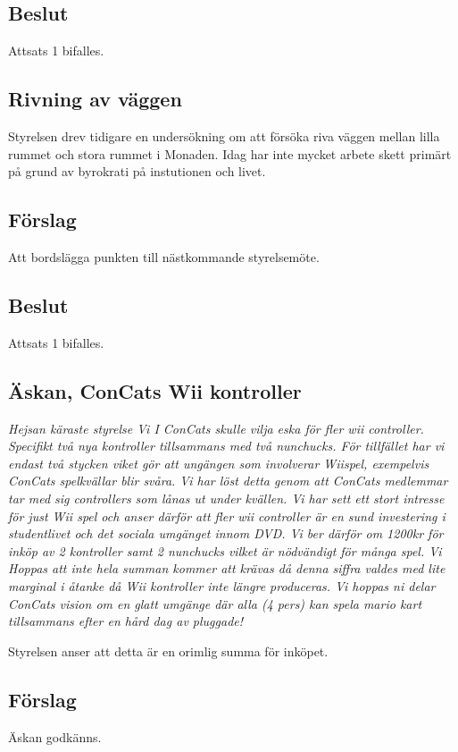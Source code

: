 \documentclass[protokoll]{dvd}
\begin{document}
\subsection{Beslut}
Attsats 1 bifalles.

\subsection*{Rivning av väggen}
Styrelsen drev tidigare en undersökning om att försöka riva väggen mellan lilla rummet och stora rummet i Monaden.
Idag har inte mycket arbete skett primärt på grund av byrokrati på instutionen och livet.

\subsection{Förslag}
\begin{attsatser}
    \item Att bordslägga punkten till nästkommande styrelsemöte.
\end{attsatser}
\subsection{Beslut}
Attsats 1 bifalles.

\subsection*{Äskan, ConCats Wii kontroller}
\textit{Hejsan käraste styrelse
Vi I ConCats skulle vilja eska för fler wii controller. Specifikt två nya kontroller tillsammans med två nunchucks.
För tillfället har vi endast två stycken viket gör att ungängen som involverar Wiispel, exempelvis ConCats spelkvällar blir svåra. Vi har löst detta genom att ConCats medlemmar tar med sig controllers som lånas ut under kvällen.
Vi har sett ett stort intresse för just Wii spel och anser därför att fler wii controller är en sund investering i studentlivet och det sociala umgänget innom DVD.
Vi ber därför om 1200kr för inköp av 2 kontroller samt 2 nunchucks vilket är nödvändigt för många spel. Vi Hoppas att inte hela summan kommer att krävas då denna siffra valdes med lite marginal i åtanke då Wii kontroller inte längre produceras.
Vi hoppas ni delar ConCats vision om en glatt umgänge där alla (4 pers) kan spela mario kart tillsammans efter en hård dag av pluggade!}

Styrelsen anser att detta är en orimlig summa för inköpet.
\subsection{Förslag}
\begin{attsatser}
    \item Äskan godkänns.
\end{attsatser}
\end{document}
